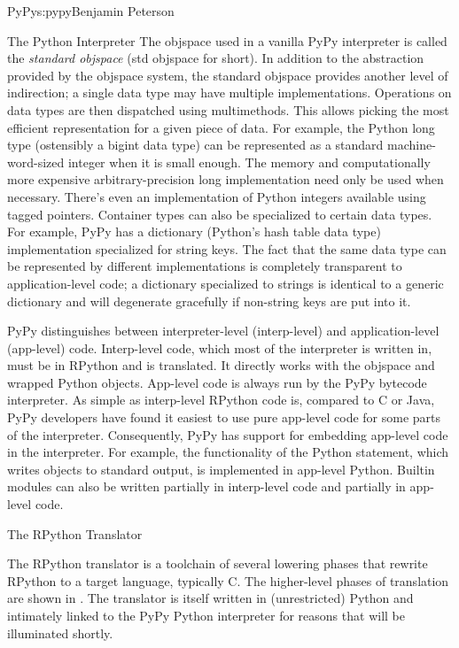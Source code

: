 \begin{aosachapter}{PyPy}{s:pypy}{Benjamin Peterson}
\begin{aosasect1}{The Python Interpreter}
The objspace used in a vanilla PyPy interpreter is called the \emph{standard
  objspace} (std objspace for short). In addition to the abstraction provided by
the objspace system, the standard objspace provides another level of
indirection; a single data type may have multiple implementations. Operations on
data types are then dispatched using multimethods. This allows picking the most
efficient representation for a given piece of data. For example, the Python long
type (ostensibly a bigint data type) can be represented as a standard 
machine-word-sized 
integer when it is small enough. The memory and computationally more
expensive arbitrary-precision long implementation need only be used when
necessary. There's even an implementation of Python integers available using
tagged pointers. Container types can also be specialized to certain data
types. For example, PyPy has a dictionary (Python's hash table data type)
implementation specialized for string keys. The fact that the same data type
can be represented by different implementations is completely transparent to
application-level code; a dictionary specialized to strings is identical to a
generic dictionary and will degenerate gracefully if non-string keys are put
into it.

PyPy distinguishes between interpreter-level (interp-level) and
application-level (app-level) code. Interp-level code, which most of the
interpreter is written in, must be in RPython and is translated. It directly
works with the objspace and wrapped Python objects. App-level code is always run
by the PyPy bytecode interpreter. As simple as interp-level RPython code is,
compared to C or Java, PyPy developers have found it easiest to use pure app-level
code for some parts of the interpreter. Consequently, PyPy has support for
embedding app-level code in the interpreter. For example, the functionality of
the Python  statement, which writes objects to standard output, is
implemented in app-level Python. Builtin modules can also be written partially
in interp-level code and partially in app-level code.

\end{aosasect1}

\begin{aosasect1}{The RPython Translator}
\label{sec.pypy.translator}

The RPython translator is a toolchain of several lowering phases that rewrite
RPython to a target language, typically C. The higher-level phases of
translation are shown in . The translator is
itself written in (unrestricted) Python and intimately linked to the PyPy Python
interpreter for reasons that will be illuminated shortly.


\end{aosasect1}
\end{aosachapter}
